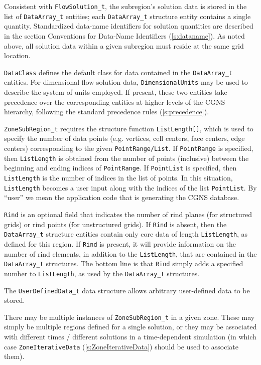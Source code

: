 Consistent with \texttt{FlowSolution\_t},
the subregion's solution data is stored in the list of
\texttt{DataArray\_t} entities;
each \texttt{DataArray\_t} structure entity contains a single quantity.
Standardized data-name identifiers for solution quantities are described
in the section Conventions for Data-Name Identifiers (\autoref{s:dataname}).
As noted above, all solution data
within a given subregion must reside at the same grid location.

\texttt{DataClass} defines the default class
for data contained in the \texttt{DataArray\_t} entities. For dimensional
flow solution data, \texttt{DimensionalUnits}
may be used to describe the system of units employed. If present, these two entities
take precedence over the corresponding entities at higher levels of the
CGNS hierarchy, following the standard precedence rules (\autoref{s:precedence}).

\texttt{ZoneSubRegion\_t} requires the structure function
\texttt{ListLength[]},
which is used to specify the number
of data points (e.g. vertices, cell centers, face centers, edge centers)
corresponding to the given \texttt{PointRange/List}.
If \texttt{PointRange} is specified, then \texttt{ListLength} is obtained
from the number of points (inclusive) between the beginning and ending indices
of \texttt{PointRange}. If \texttt{PointList} is specified,
then \texttt{ListLength} is the number of indices in the list of points.
In this situation, \texttt{ListLength} becomes a user input along with the
indices of the list \texttt{PointList}. By ``user'' we mean the application
code that is generating the CGNS database.

\texttt{Rind} is an optional field that indicates the
number of rind planes (for structured grids) or rind points (for unstructured grids).
If \texttt{Rind} is absent, then the \texttt{DataArray\_t} structure entities contain
only core data of length \texttt{ListLength}, as defined for this region.
If \texttt{Rind} is present, it will provide information on the number of
rind elements, in addition to the \texttt{ListLength}, that are contained
in the \texttt{DataArray\_t} structures. The bottom line is that \texttt{Rind}
simply adds a specified number to \texttt{ListLength},
as used by the \texttt{DataArray\_t} structures.

The \texttt{UserDefinedData\_t} data structure
allows arbitrary user-defined data to be stored.

There may be multiple instances of \texttt{ZoneSubRegion\_t} in a given zone.
These may simply be multiple regions defined for a single solution,
or they may be associated with different times / different solutions in a
time-dependent simulation (in which case
\texttt{ZoneIterativeData} (\autoref{s:ZoneIterativeData}) should be
used to associate them).

